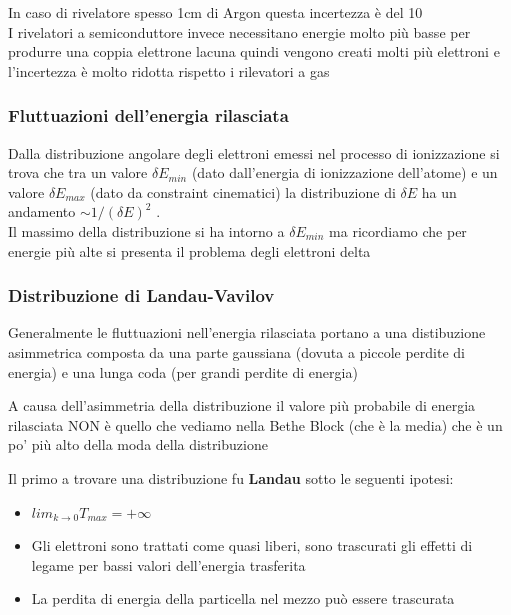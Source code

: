 \begin{remark}

    In caso di rivelatore spesso 1cm di Argon questa incertezza è del 10%
\\
    I rivelatori a semiconduttore invece necessitano energie molto più basse per produrre una coppia elettrone lacuna quindi vengono creati molti più elettroni e l'incertezza è molto ridotta rispetto i rilevatori a gas

\end{remark}

\subsubsection*{Fluttuazioni dell'energia rilasciata}
Dalla distribuzione angolare degli elettroni emessi nel processo di ionizzazione si trova che tra un valore $\delta E_{min}$ (dato dall'energia di ionizzazione dell'atome) e un valore $\delta E_{max}$ (dato da constraint cinematici) la distribuzione di $\delta E$ ha un andamento $\sim 1/(\delta E)^2$ .
\\
Il massimo della distribuzione si ha intorno a $\delta E_{min}$ ma ricordiamo che per energie più alte si presenta il problema degli elettroni delta

\subsubsection*{Distribuzione di Landau-Vavilov}

Generalmente le fluttuazioni nell'energia rilasciata portano a una distibuzione asimmetrica composta da una parte gaussiana (dovuta a piccole perdite di energia) e una lunga coda (per grandi perdite di energia)

\begin{note}
    A causa dell'asimmetria della distribuzione il valore più probabile di energia rilasciata NON è quello che vediamo nella Bethe Block (che è la media) che è un po' più alto della moda della distribuzione
\end{note}
Il primo a trovare una distribuzione fu \textbf{Landau} sotto le seguenti ipotesi:
\begin{itemize}
    \item $lim_{k \to0} T_{max}= +\infty$
    \item Gli elettroni sono trattati come quasi liberi, sono trascurati gli effetti di legame per bassi valori dell'energia trasferita
    \item La perdita di energia della particella nel mezzo può essere trascurata
\end{itemize}

